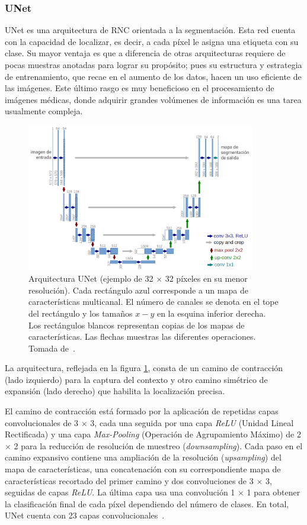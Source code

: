 \subsubsection{UNet}

UNet es una arquitectura de RNC orientada a la segmentación. Esta red cuenta con la capacidad de localizar, es decir, a cada píxel le asigna una etiqueta con su clase. Su mayor ventaja es que a diferencia de otras arquitecturas requiere de pocas muestras anotadas para lograr su propósito; pues su estructura y estrategia de entrenamiento, que recae en el aumento de los datos, hacen un uso eficiente de las imágenes. Este último rasgo es muy beneficioso en el procesamiento de imágenes médicas, donde adquirir grandes volúmenes de información es una tarea usualmente compleja.

\begin{figure}[ht]
	\centering
	\includegraphics[width=10cm]{./Graphics/unet.png}
	\caption{Arquitectura UNet (ejemplo de 32 $\times$ 32 píxeles en su menor resolución). Cada rectángulo azul corresponde a un mapa de características multicanal. El número de canales se denota en el tope del rectángulo y los tamaños $x-y$ en la esquina inferior derecha. Los rectángulos blancos representan copias de los mapas de características. Las flechas muestras las diferentes operaciones. Tomada de~\cite{ronneberger2015u}.}
	\label{fig:unet}
\end{figure}

La arquitectura, reflejada en la figura \ref{fig:unet}, consta de un camino de contracción (lado izquierdo) para la captura del contexto y otro camino simétrico de expansión (lado derecho) que habilita la localización precisa.

El camino de contracción está formado por la aplicación de repetidas capas convolucionales de 3 $\times$ 3, cada una seguida por una capa \textit{ReLU} (Unidad Lineal Rectificada) y una capa \textit{Max-Pooling} (Operación de Agrupamiento Máximo) de 2 $\times$ 2 para la reducción de resolución de muestreo (\textit{downsampling}). Cada paso en el camino expansivo contiene una ampliación de la resolución (\textit{upsampling}) del mapa de características, una concatenación con su correspondiente mapa de características recortado del primer camino y dos convoluciones de 3 $\times$ 3, seguidas de capas \textit{ReLU}. La última capa usa una convolución 1 $\times$ 1 para obtener la clasificación final de cada píxel dependiendo del número de clases. En total, UNet cuenta con 23 capas convolucionales~\cite{ronneberger2015u}.

